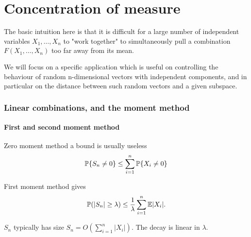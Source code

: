 \part{Concentration of measure}

The basic intuition here is that it is difficult for a large number of independent variables $X_1,\dots,X_n$ to "work together" to simultaneously pull a combination $F(X_1,\dots,X_n)$ too far away from its mean.

We will focus on a specific application which is useful on controlling the behaviour of random n-dimensional vectors with independent components, and in particular on the distance between such random vectors and a given subspace.

\section{Linear combinations, and the moment method}





\subsection{First and second moment method}

Zero moment method a bound is usually useless
\begin{equation}\label{zero moment method}
    \mathbb{P}\{S_n\neq 0\} \leq \sum_{i=1}^n \mathbb{P}\{X_i \neq 0\}
\end{equation}

First moment method gives
\begin{equation}\label{first moment method}
    \mathbb{P}(|S_n|\geq \lambda) \leq \frac{1}{\lambda } \sum_{i=1}^n \mathbb{E} |X_i|.
\end{equation}

$S_n$ typically has size $S_n=O(\sum_{i=1}^n|X_i| )$. The decay is linear in $\lambda$.


